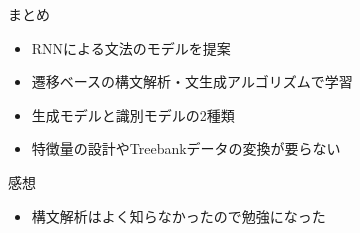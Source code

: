 \documentclass[aspectratio=43,unicode,10pt]{beamer}
\begin{document}
\begin{frame}{まとめ}
  \begin{itemize}
    \item RNNによる文法のモデルを提案
    \item 遷移ベースの構文解析・文生成アルゴリズムで学習
    \item 生成モデルと識別モデルの2種類
    \item 特徴量の設計やTreebankデータの変換が要らない
  \end{itemize}
\end{frame}

\begin{frame}{感想}
  \begin{itemize}
    \item 構文解析はよく知らなかったので勉強になった
  \end{itemize}
\end{frame}
\end{document}
